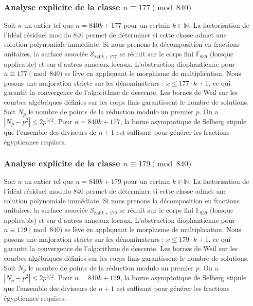 \documentclass[11pt,a4paper]{article}
\begin{document}
\subsubsection{Analyse explicite de la classe $n \equiv 177 \pmod{840}$}
Soit $n$ un entier tel que $n = 840k + 177$ pour un certain $k \in \mathbb{N}$.
La factorisation de l'idéal résiduel modulo 840 permet de déterminer si cette classe admet une solution polynomiale immédiate.
Si nous prenons la décomposition en fractions unitaires, la surface associée $\mathcal{S}_{840k+177}$ se réduit sur le corps fini $\mathbb{F}_{839}$ (lorsque applicable) et sur d'autres anneaux locaux.
L'obstruction diophantienne pour $n \equiv 177 \pmod{840}$ se lève en appliquant le morphisme de multiplication.
Nous posons une majoration stricte sur les dénominateurs : $x \le 177 \cdot k + 1$, ce qui garantit la convergence de l'algorithme de descente.
Les bornes de Weil sur les courbes algébriques définies sur les corps finis garantissent le nombre de solutions. Soit $N_p$ le nombre de points de la réduction modulo un premier $p$.
On a $|N_p - p^2| \le 2 p^{3/2}$.
Pour $n = 840k + 177$, la borne asymptotique de Selberg stipule que l'ensemble des diviseurs de $n+1$ est suffisant pour générer les fractions égyptiennes requises.

\subsubsection{Analyse explicite de la classe $n \equiv 179 \pmod{840}$}
Soit $n$ un entier tel que $n = 840k + 179$ pour un certain $k \in \mathbb{N}$.
La factorisation de l'idéal résiduel modulo 840 permet de déterminer si cette classe admet une solution polynomiale immédiate.
Si nous prenons la décomposition en fractions unitaires, la surface associée $\mathcal{S}_{840k+179}$ se réduit sur le corps fini $\mathbb{F}_{839}$ (lorsque applicable) et sur d'autres anneaux locaux.
L'obstruction diophantienne pour $n \equiv 179 \pmod{840}$ se lève en appliquant le morphisme de multiplication.
Nous posons une majoration stricte sur les dénominateurs : $x \le 179 \cdot k + 1$, ce qui garantit la convergence de l'algorithme de descente.
Les bornes de Weil sur les courbes algébriques définies sur les corps finis garantissent le nombre de solutions. Soit $N_p$ le nombre de points de la réduction modulo un premier $p$.
On a $|N_p - p^2| \le 2 p^{3/2}$.
Pour $n = 840k + 179$, la borne asymptotique de Selberg stipule que l'ensemble des diviseurs de $n+1$ est suffisant pour générer les fractions égyptiennes requises.
\end{document}
